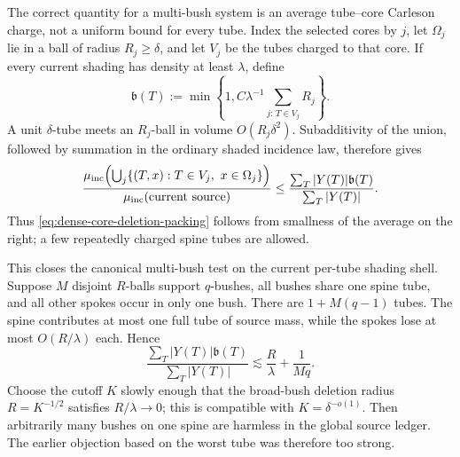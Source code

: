 \documentclass[11pt]{article}
\begin{document}
The correct quantity for a multi-bush system is an average tube--core
Carleson charge, not a uniform bound for every tube.  Index the selected
cores by \(j\), let \(\Omega_j\) lie in a ball of radius \(R_j\ge\delta\),
and let \(V_j\) be the tubes charged to that core.  If every current shading
has density at least \(\lambda\), define
\begin{equation}\label{eq:tube-core-carleson-charge}
 \mathfrak b(T)
 :=\min\!\left\{1,
  C\lambda^{-1}\sum_{j:\,T\in V_j}R_j\right\}.
\end{equation}
A unit \(\delta\)-tube meets an \(R_j\)-ball in volume
\(O(R_j\delta^2)\).  Subadditivity of the union, followed by summation in
the ordinary shaded incidence law, therefore gives
\begin{equation}\label{eq:average-carrier-packing-criterion}
 \frac{
  \mu_{\rm inc}\!\left(
   \bigcup_j\{(T,x):T\in V_j,\ x\in\Omega_j\}\right)}
 {\mu_{\rm inc}(\text{current source})}
 \le
 \frac{\sum_T|Y(T)|\mathfrak b(T)}{\sum_T|Y(T)|}.
\end{equation}
Thus \eqref{eq:dense-core-deletion-packing} follows from smallness of the
average on the right; a few repeatedly charged spine tubes are allowed.

This closes the canonical multi-bush test on the current per-tube shading
shell.  Suppose \(M\) disjoint
\(R\)-balls support \(q\)-bushes, all bushes share one spine tube, and all
other spokes occur in only one bush.  There are \(1+M(q-1)\) tubes.  The
spine contributes at most one full tube of source mass, while the spokes lose
at most \(O(R/\lambda)\) each.  Hence
\begin{equation}\label{eq:spine-multibush-charge}
 \frac{\sum_T|Y(T)|\mathfrak b(T)}{\sum_T|Y(T)|}
 \lesssim
 \frac{R}{\lambda}+\frac1{Mq}.
\end{equation}
Choose the cutoff \(K\) slowly enough that the broad-bush deletion radius
\(R=K^{-1/2}\) satisfies \(R/\lambda\to0\); this is compatible with
\(K=\delta^{-o(1)}\).  Then arbitrarily many bushes on one spine are
harmless in the global source ledger.  The earlier objection based on the
worst tube was therefore too strong.
\end{document}
